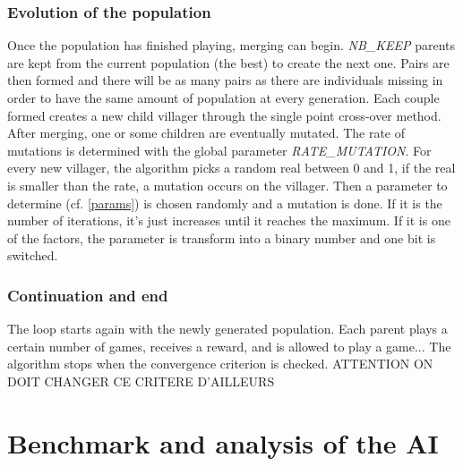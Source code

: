 \documentclass[11pt,a4paper]{article}
\begin{document}
\subsubsection{Evolution of the population}
Once the population has finished playing, merging can begin. \textit{NB\_KEEP} parents are kept from the current population (the best) to create the next one. Pairs are then formed and there will be as many pairs as there are individuals missing in order to have the same amount of population at every generation. Each couple formed creates a new child villager through the single point cross-over method.\\
After merging, one or some children are eventually mutated. The rate of mutations is determined with the global parameter \textit{RATE\_MUTATION}. For every new villager, the algorithm picks a random real between 0 and 1, if the real is smaller than the rate, a mutation occurs on the villager. Then a parameter to determine (cf. \ref{params})
is chosen randomly and a mutation is done. If it is the number of iterations, it's just increases until it reaches the maximum. If it is one of the factors, the parameter is transform into a binary number and one bit is switched.
\subsubsection{Continuation and end}
The loop starts again with the newly generated population. Each parent plays a certain number of games, receives a reward, and is allowed to play a game... The algorithm stops when the convergence criterion is checked. 
ATTENTION ON DOIT CHANGER CE CRITERE D'AILLEURS
\section{Benchmark and analysis of the AI}



\end{document}
